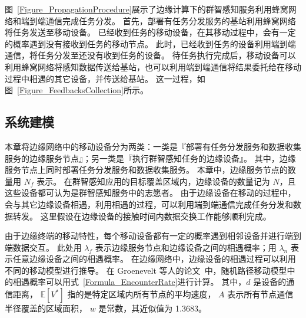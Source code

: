 图~\ref{Figure_PropagationProcedure}展示了边缘计算下的群智感知服务利用蜂窝网络和端到端通信完成任务分发。
首先，部署有任务分发服务的基站利用蜂窝网络将任务发送至移动设备。
已经收到任务的移动设备，在其移动过程中，会有一定的概率遇到没有接收到任务的移动节点。
此时，已经收到任务的设备利用端到端通信，将任务分发至还没有收到任务的设备。
待任务执行完成后，移动设备可以利用蜂窝网络将感知数据传送给基站，也可以利用端到端通信将结果委托给在移动过程中相遇的其它设备，并传送给基站。
这一过程，如图~\ref{Figure_FeedbacksCollection}所示。

\subsection{系统建模}

本章将边缘网络中的移动设备分为两类：一类是『部署有任务分发服务和数据收集服务的边缘服务节点』；另一类是『执行群智感知任务的边缘设备』。
其中，边缘服务节点上同时部署任务分发服务和数据收集服务。
本章中，边缘服务节点的数量用 $N_f$ 表示。
在群智感知应用的目标覆盖区域内，边缘设备的数量记为 $N$，且这些设备都可认为是群智感知服务中的志愿者。
由于边缘设备在移动的过程中，会与其它边缘设备相遇，利用相遇的过程，可以利用端到端通信完成任务分发和数据转发。
这里假设在边缘设备的接触时间内数据交换工作能够顺利完成。


由于边缘终端的移动特性，每个移动设备都有一定的概率遇到相邻设备并进行端到端数据交互。
此处用 $\lambda_f$ 表示边缘服务节点和边缘设备之间的相遇概率；用 $\lambda_n$ 表示任意边缘设备之间的相遇概率。
在边缘网络中，边缘设备的相遇过程可以利用不同的移动模型进行推导。
在 Groenevelt 等人的论文~\cite{DBLP:journals/pe/GroeneveltNK05}中，随机路径移动模型中的相遇概率可以用式~\ref{Formula_EncounterRate}进行计算。
其中，$d$ 是设备的通信距离，
$\mathbb{E}[V^*]$ 指的是特定区域内所有节点的平均速度，
$A$ 表示所有节点通信半径覆盖的区域面积，
$w$ 是常数，其近似值为 1.3683。

